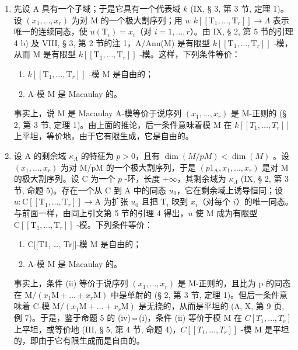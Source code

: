 \begin{enumerate}
\def\labelenumi{\arabic{enumi})}
\tightlist
\item
  先设 A 具有一个子域；于是它具有一个代表域 \(k\) (IX, § 3, 第 3 节, 定理 1)。设 \((x_{1},\ldots ,x_{r})\) 为对 M 的一个极大割序列；用 \(u:k[[\mathrm{T}_{1},\dots ,\mathrm{T}_{r}]]\longrightarrow \Lambda\) 表示唯一的连续同态，使 \(u(\mathrm{T}_i) = x_i\)（对 \(i = 1,\dots ,r\)）。由 IX, § 2, 第 5 节的引理 4 b) 及 VIII, § 3, 第 2 节的注 1，A/Ann(M) 是有限型 \(k[[\mathrm{T}_{1},\dots ,\mathrm{T}_{r}]]\) -模，从而 M 是有限型 \(k[[\mathrm{T}_{1},\dots ,\mathrm{T}_{r}]]\) -模。这样，下列条件等价：
  \begin{enumerate}
  \def\labelenumii{(\roman{enumii})}
  \item
    \(k[[\mathrm{T}_1,\dots ,\mathrm{T}_r]]\) -模 M 是自由的；
\item
    A-模 M 是 Macaulay 的。
\end{enumerate}

事实上，说 M 是 Macaulay A-模等价于说序列 \((x_{1},\ldots,x_{r})\) 是 M-正则的 (§ 2, 第 3 节, 定理 1)。由上面的推论，后一条件意味着模 M 在 \(k[[T_{1},\ldots,T_{r}]]\) 上平坦，等价地，由于它有限生成，它是自由的。

\item
  设 A 的剩余域 \(\kappa_{\Lambda}\) 的特征为 \(p > 0\)，且有 \(\dim(M/pM) < \dim(M)\) 。设 \((x_1, \ldots, x_r)\) 为对 M/pM 的一个极大割序列，于是 \((p1_{\mathrm{A}}, x_1, \ldots, x_r)\) 是对 M 的极大割序列。设 C 为一个 \(p\) -环，长度 \(+\infty\)，其剩余域为 \(\kappa_{\Lambda}\) (IX, § 2, 第 3 节, 命题 5)。存在一个从 C 到 A 中的同态 \(u_0\)，它在剩余域上诱导恒同；设 \(u: \mathrm{C}[[\mathrm{T}_1, \ldots, \mathrm{T}_r]] \longrightarrow \mathrm{A}\) 为扩张 \(u_0\) 且把 \(\mathrm{T}_i\) 映到 \(x_i\)（对每个 \(i\)）的唯一同态。与前面一样，由同上引文第 5 节的引理 4 得出，\(u\) 使 M 成为有限型 \(\mathrm{C}[[\mathrm{T}_1, \ldots, \mathrm{T}_r]]\) -模。下列条件等价：
  \begin{enumerate}
  \def\labelenumii{(\roman{enumii})}
\item
    C{[}{[}T1, \ldots, Tr{]}{]}-模 M 是自由的；
\item
    A-模 M 是 Macaulay 的。
\end{enumerate}

事实上，条件 (ii) 等价于说序列 \((x_{1},\ldots,x_{r})\) 是 M-正则的，且比为 p 的同态在 \(\mathrm{M}/(x_{1}\mathrm{M}+\ldots+x_{r}\mathrm{M})\) 中是单射的 (§ 2, 第 3 节, 定理 1)。但后一条件意味着 C-模 \(\mathrm{M}/(x_{1}\mathrm{M}+\ldots+x_{r}\mathrm{M})\) 是无挠的，从而是平坦的 (Λ, X, 第 9 页, 例 7)。于是，鉴于命题 5 的 (iv)⇔(i)，条件 (ii) 等价于模 M 在 \(C[T_{1},\ldots,T_{r}]\) 上平坦，或等价地 (III, § 5, 第 4 节, 命题 4)，\(C[[T_{1},\ldots,T_{r}]]\) -模 M 是平坦的，即由于它有限生成而是自由的。

\end{enumerate}


